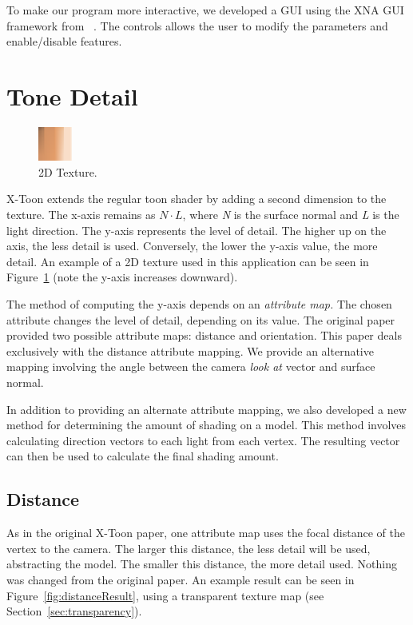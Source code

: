 \documentclass[annual]{acmsiggraph}
\begin{document}
To make our program more interactive, we developed a GUI using the XNA GUI framework from ~\cite{Ruminate}. The controls allows the user to modify the parameters and enable/disable features.

\section{Tone Detail}
\label{sec:tonedetail}
\begin{figure}
  \vspace{-20pt}
  \begin{center}
    \includegraphics[width=0.1\textwidth]{images/xtoon_skin}
  \end{center}
  \caption{2D Texture.}
  \vspace{-10pt}
  \label{fig:2dtexture}
\end{figure}
X-Toon extends the regular toon shader by adding a second dimension to the texture. The x-axis remains as $N\cdot L$, where {\it{N}} is the surface normal and {\it{L}} is the light direction. The y-axis represents the level of detail. The higher up on the axis, the less detail is used. Conversely, the lower the y-axis value, the more detail. An example of a 2D texture used in this application can be seen in Figure~\ref{fig:2dtexture} (note the y-axis increases downward).

The method of computing the y-axis depends on an {\it{attribute map.}} The chosen attribute changes the level of detail, depending on its value. The original paper provided two possible attribute maps: distance and orientation. This paper deals exclusively with the distance attribute mapping. We provide an alternative mapping involving the angle between the camera {\it{look at}} vector and surface normal. 

In addition to providing an alternate attribute mapping, we also developed a new method for determining the amount of shading on a model. This method involves calculating direction vectors to each light from each vertex. The resulting vector can then be used to calculate the final shading amount.

\subsection{Distance}
\label{sec:distance}
As in the original X-Toon paper, one attribute map uses the focal distance of the vertex to the camera. The larger this distance, the less detail will be used, abstracting the model. The smaller this distance, the more detail used. Nothing was changed from the original paper. An example result can be seen in Figure~\ref{fig:distanceResult}, using a transparent texture map (see Section~\ref{sec:transparency}).
\end{document}
